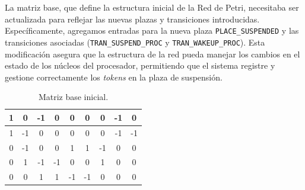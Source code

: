 La matriz base, que define la estructura inicial de la Red de Petri, necesitaba ser actualizada para reflejar las nuevas plazas y transiciones introducidas. Específicamente, agregamos entradas para la nueva plaza \verb|PLACE_SUSPENDED| y las transiciones asociadas (\verb|TRAN_SUSPEND_PROC| y \verb|TRAN_WAKEUP_PROC|). Esta modificación asegura que la estructura de la red pueda manejar los cambios en el estado de los núcleos del procesador, permitiendo que el sistema registre y gestione correctamente los \textit{tokens} en la plaza de suspensión.\par

\renewcommand{\arraystretch}{1.5}
\setlength{\tabcolsep}{10pt}

\begin{table}[H]
    \centering
    \begin{tabular}{|c|c|c|c|c|c|c|c|c|}
        \hline
        1 & 0  & -1 & 0  & 0  & 0  & 0  & -1 & 0  \\
        \hline
        1 & -1 & 0  & 0  & 0  & 0  & 0  & -1 & -1 \\
        \hline
        0 & -1 & 0  & 0  & 1  & 1  & -1 & 0  & 0  \\
        \hline
        0 & 1  & -1 & -1 & 0  & 0  & 1  & 0  & 0  \\
        \hline
        0 & 0  & 1  & 1  & -1 & -1 & 0  & 0  & 0  \\
        \hline
    \end{tabular}
    \caption{Matriz base inicial.}
    \label{tabla:matriz_base_pre}
\end{table}

